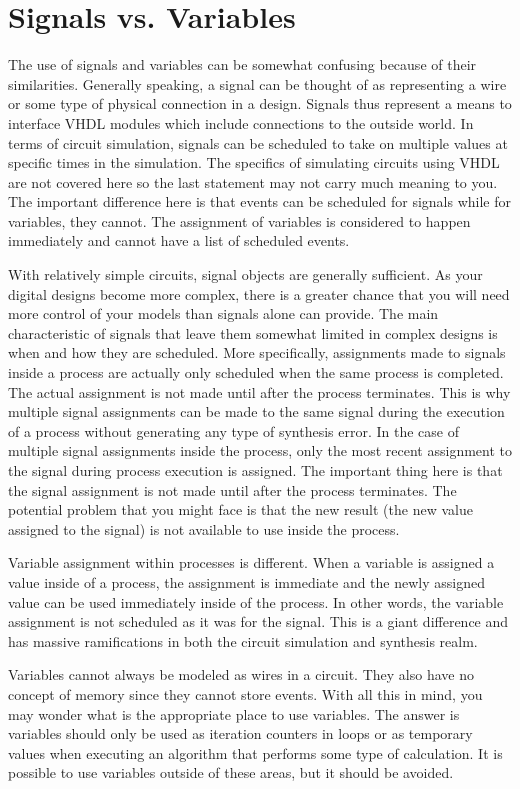 \section{Signals vs. Variables}
The use of signals and variables can be somewhat confusing because of their similarities. Generally speaking, a signal can be thought of as representing a wire or some type of physical connection in a design. Signals thus represent a means to interface VHDL modules which include connections to the outside world. In terms of circuit simulation, signals can be scheduled to take on multiple values at specific times in the simulation. The specifics of simulating circuits using VHDL are not covered here so the last statement may not carry much meaning to you. The important difference here is that events can be scheduled for signals while for variables, they cannot. The assignment of variables is considered to happen immediately and cannot have a list of scheduled events.

With relatively simple circuits, signal objects are generally sufficient. As your digital designs become more complex, there is a greater chance that you will need more control of your models than signals alone can provide. The main characteristic of signals that leave them somewhat limited in complex designs is when and how they are scheduled. More specifically, assignments made to signals inside a process are actually only scheduled when the same process is completed. The actual assignment is not made until after the process terminates. This is why multiple signal assignments can be made to the same signal during the execution of a process without generating any type of synthesis error. In the case of multiple signal assignments inside the process, only the most recent assignment to the signal during process execution is assigned. The important thing here is that the signal assignment is not made until after the process terminates. The potential problem that you might face is that the new result (the new value assigned to the signal) is not available to use inside the process. 

Variable assignment within processes is different. When a variable is assigned a value inside of a process, the assignment is immediate and the newly assigned value can be used immediately inside of the process. In other words, the variable assignment is not scheduled as it was for the signal. This is a giant difference and has massive ramifications in both the circuit simulation and synthesis realm. 

Variables cannot always be modeled as wires in a circuit. They also have no concept of memory since they cannot store events. With all this in mind, you may wonder what is the appropriate place to use variables. The answer is variables should only be used as iteration counters in loops or as temporary values when executing an algorithm that performs some type of calculation. It is possible to use variables outside of these areas, but it should be avoided.

